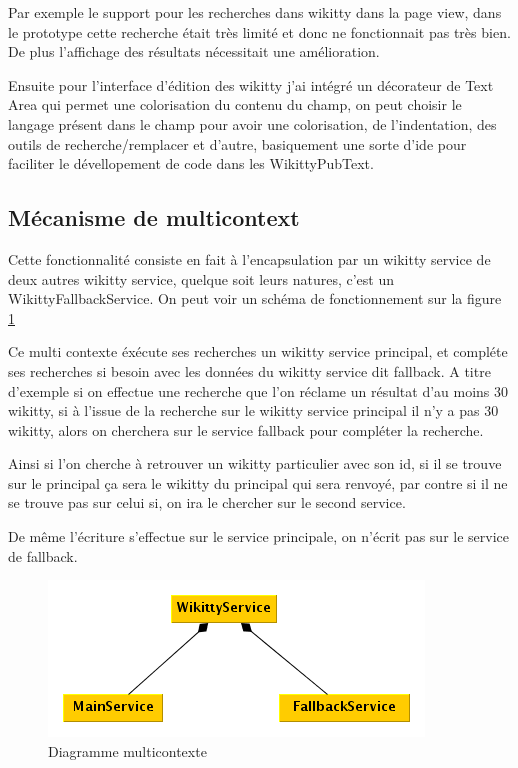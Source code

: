 Par exemple le support pour les recherches dans wikitty dans la page view,
dans le prototype cette recherche était très limité et donc ne fonctionnait pas
très bien. De plus l'affichage des résultats nécessitait une amélioration.

Ensuite pour l'interface d'édition des wikitty j'ai intégré un décorateur de
Text Area qui permet une colorisation du contenu du champ, on peut choisir le
langage présent dans le champ pour avoir une colorisation, de l'indentation, des
outils de recherche/remplacer et d'autre, basiquement une sorte d'ide pour
faciliter le dévellopement de code dans les WikittyPubText.



\subsection{Mécanisme de multicontext}

Cette fonctionnalité consiste en fait à l'encapsulation par un wikitty service
de deux autres wikitty service, quelque soit leurs natures, c'est un 
WikittyFallbackService. On peut voir un schéma de fonctionnement sur la figure
\ref{diagmulticontext}

Ce multi contexte éxécute ses recherches un wikitty service principal, et
compléte ses recherches si besoin avec les données du wikitty service dit
fallback. A titre d'exemple si on effectue une recherche que l'on réclame un
résultat d'au moins 30 wikitty, si à l'issue de la recherche sur le wikitty 
service principal il n'y a pas 30 wikitty, alors on cherchera sur le service
fallback pour compléter la recherche. 

Ainsi si l'on cherche à retrouver un wikitty particulier avec son id, si il
se trouve sur le principal ça sera le wikitty du principal qui sera renvoyé, 
par contre si il ne se trouve pas sur celui si, on ira le chercher sur le second
service.

De même l'écriture s'effectue sur le service principale, on n'écrit pas sur le
service de fallback.

\begin{figure}[!ht]
\centering
\includegraphics{image/multicontext.png}
  		\caption{Diagramme multicontexte}
  		\label{diagmulticontext}
\end{figure}


